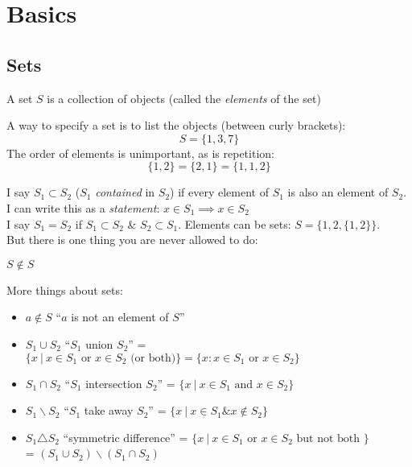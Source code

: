 \setcounter{lecture}{1}
\pagebreak
\section{Basics}

\subsection{Sets} %
\label{sub:sets}

A set $S$ is a collection of objects (called the \emph{elements} of the set) 
\begin{example}
A way to specify a set is to list the objects (between curly brackets):
\[S = \{1,3,7\}\]	
The order of elements is unimportant, as is repetition:
\[\{1,2\} = \{2,1\} = \{1,1,2\}\]
\end{example}

I say $S_1 \subset S_2$ ($S_1$ \emph{contained} in $S_2$) if every element of $S_1$ is also an element of $S_2$. I can write this as a \emph{statement}: $x \in S_1 \implies x \in S_2$\\

I say $S_1 = S_2$ if $S_1 \subset S_2$ \& $S_2 \subset S_1$. Elements can be sets: $S = \{1,2,\{1,2\}\}$.\\
 But there is one thing you are never allowed to do:

\begin{axiom}
$S \not \in S$	
\end{axiom}

More things about sets:
\begin{itemize}
\item $a \not \in S$ ``$a$ is not an element of $S$''
\item $S_1 \cup S_2$ ``$S_1$ union $S_2$'' = $\{x ~|~ x \in S_1 \text{ or } x \in S_2 \text{ (or both)}\} = \{x : x \in S_1 \text{ or } x \in S_2\}$
\item $S_1 \cap S_2$ ``$S_1$ intersection $S_2$'' = $\{x ~|~ x \in S_1 \text{ and } x \in S_2\}$
\item $S_1 \backslash S_2$ ``$S_1$ take away $S_2$'' = $\{x ~|~ x \in S_1 \& x \not \in S_2\}$
\item $S_1 \triangle S_2$ ``symmetric difference'' = $\{x ~|~ x \in S_1 \text{ or } x \in S_2 \text{ but not both }\}$\\ = $(S_1 \cup S_2) \backslash (S_1 \cap S_2)$
\end{itemize}

